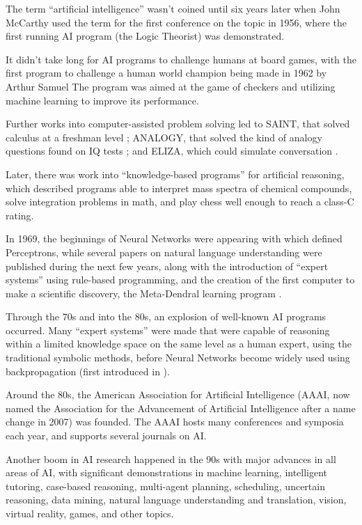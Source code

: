 The term ``artificial intelligence'' wasn't coined until six years later when
John McCarthy used the term for the first conference on the topic in 1956, where
the first running AI program (the Logic Theorist) was demonstrated.

It didn't take long for AI programs to challenge humans at board games, with the
first program to challenge a human world champion being made in 1962 by Arthur
Samuel The program was aimed at the game of checkers and utilizing machine
learning to improve its performance.

Further works into computer-assisted problem solving led to SAINT, that solved
calculus at a freshman level \citep{slagle1963heuristic}; ANALOGY, that solved
the kind of analogy questions found on IQ tests \citet{evans1964program}; and
ELIZA, which could simulate conversation \citep{weizenbaum1966eliza}.

Later, there was work into ``knowledge-based programs'' for artificial
reasoning, which described programs able to interpret mass spectra of chemical
compounds, solve integration problems in math, and play chess well enough to
reach a class-C rating.

In 1969, the beginnings of Neural Networks were appearing with
\citet{minsky1969perceptrons} which defined Perceptrons, while several papers on
natural language understanding were published during the next few years, along
with the introduction of ``expert systems'' using rule-based programming, and
the creation of the first computer to make a scientific discovery, the
Meta-Dendral learning program \citep{buchanan1976applications}.

Through the 70s and into the 80s, an explosion of well-known AI programs
occurred. Many ``expert systems'' were made that were capable of reasoning
within a limited knowledge space on the same level as a human expert, using the
traditional symbolic methods, before Neural Networks become widely used using
backpropagation (first introduced in \citet{werbos1974beyond}).

Around the 80s, the American Association for Artificial Intelligence (AAAI, now
named the Association for the Advancement of Artificial Intelligence after a
name change in 2007) was founded. The AAAI hosts many conferences and symposia
each year, and supports several journals on AI.

Another boom in AI research happened in the 90s with major advances in all areas
of AI, with significant demonstrations in machine learning, intelligent
tutoring, case-based reasoning, multi-agent planning, scheduling, uncertain
reasoning, data mining, natural language understanding and translation, vision,
virtual reality, games, and other topics.

